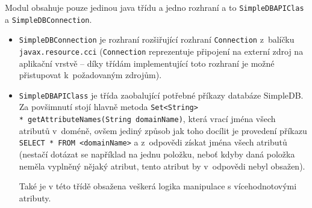 \documentclass[oneside,12pt]{fithesis2}
\begin{document}
Modul obsahuje pouze jedinou java třídu a jedno rozhraní a to \texttt{SimpleDB\allowbreak APIClas} a \verb<SimpleDBConnection<.
\begin{itemize}
 \item \verb<SimpleDBConnection< je rozhraní rozšiřující rozhraní \verb<Connection< z~balíčku \verb<javax.resource.cci< (\verb<Connection< reprezentuje připojení na externí zdroj na aplikační vrstvě -- díky třídám implementující toto rozhraní je možné přistupovat k~požadovaným zdrojům).
 \item \verb<SimpleDBAPIClass< je třída zaobalující potřebné příkazy databáze SimpleDB. Za povšimnutí stojí hlavně metoda \texttt{Set<String> \\* getAttributeNames(String domainName)}, která vrací jména všech atributů v~doméně, ovšem jediný způsob jak toho docílit je provedení příkazu \texttt{SELECT * FROM <domainName>} a z~odpovědi získat jména všech atributů (nestačí dotázat se například na jednu položku, neboť kdyby daná položka neměla vyplněný nějaký atribut, tento atribut by v~odpovědi nebyl obsažen).
 
 Také je v této třídě obsažena veškerá logika manipulace s vícehodnotovými atributy.
\end{itemize}
\end{document}
